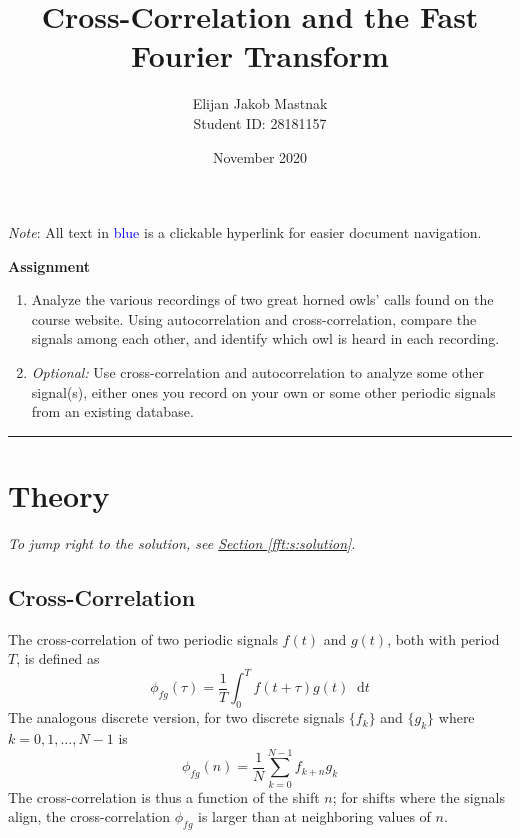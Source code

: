 \documentclass[11pt, a4paper]{article}
\newcommand{\diff}{\mathop{}\!\mathrm{d}} %
\begin{document}
\title{Cross-Correlation and the Fast Fourier Transform}
\author{Elijan Jakob Mastnak\\[1mm]\small{Student ID: 28181157}}
\date{November 2020}
\maketitle


\tableofcontents

\vspace{5mm}
\textit{Note}: All text in \textcolor{blue}{blue} is a clickable hyperlink for easier document navigation.

\newpage
\begin{center}
\textbf{Assignment}
\begin{enumerate}
	\item Analyze the various recordings of two great horned owls' calls found on the course website.  Using autocorrelation and cross-correlation, compare the signals among each other, and identify which owl is heard in each recording. 
	
	\item \textit{Optional:} Use cross-correlation and autocorrelation to analyze some other signal(s), either ones you record on your own or some other periodic signals from an existing database.
\end{enumerate}
\end{center}

\vspace{2mm}

\rule{\textwidth}{0.2pt}

\section{Theory} \label{fft:s:theory}
\vspace{-2mm}
\textit{To jump right to the solution, see \hyperref[fft:s:solution]{Section \ref{fft:s:solution}}}.

\subsection{Cross-Correlation}
The cross-correlation of two periodic signals $ f(t) $ and $ g(t) $, both with period $ T $, is defined as
\begin{equation*}
	\phi_{fg}(\tau) = \frac{1}{T}\int_{0}^{T}f(t + \tau)g(t) \diff t
\end{equation*}
The analogous discrete version, for two discrete signals $ \{f_{k}\} $ and $ \{g_{k}\} $ where $ k = 0, 1, \ldots, N -1 $ is
\begin{equation*}
	\phi_{fg}(n) = \frac{1}{N}\sum_{k = 0}^{N-1}f_{k+n}g_{k}
\end{equation*}
The cross-correlation is thus a function of the shift $ n $; for shifts where the signals align, the cross-correlation $ \phi_{fg} $ is larger than at neighboring values of $ n $.
\end{document}
